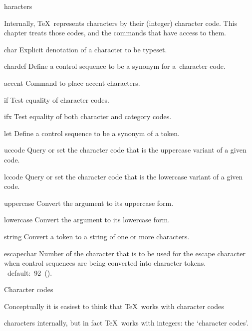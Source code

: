 \subject[char] Characters

Internally, \TeX\ represents characters by their (integer) 
character code. This chapter treats those codes, and the
commands that have access to them.

\invent
\item char
      Explicit denotation of a character to be typeset. 

\item chardef 
      Define a control sequence to be a synonym for
      a~character code.

\item accent 
      Command to place accent characters.

\item if
      Test equality of character codes. 

\item ifx
      Test equality of both character and category codes.

\item let
      Define a control sequence to be a synonym of a token.

\item uccode 
      Query or set
      the character code that is the uppercase variant of a given code.

\item lccode
      Query or set
      the character code that is the lowercase variant of a given code.

\item uppercase
      Convert the  argument to its uppercase form.

\item lowercase 
      Convert the  argument to its lowercase form.

\item string
      Convert a token to a string of one or more characters.
\item escapechar
      Number of the character that is to be used 
      for the escape character
      when control sequences are being converted
      into character tokens. \IniTeX\ default:~92~(\cs{}).

\inventstop

 Character codes

Conceptually it is easiest to think that \TeX\ works with
\term character codes\par
characters internally, but in fact
\TeX\ works with integers: the `character codes'. 


